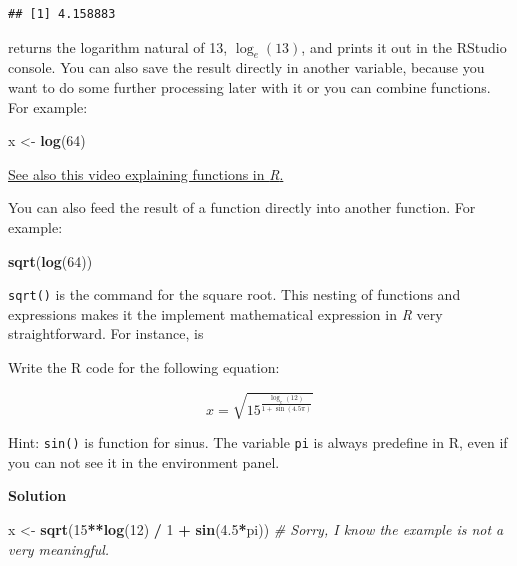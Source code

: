 \documentclass[
]{scrartcl}
\makeatletter
\newenvironment{Shaded}{\begin{snugshade}}{\end{snugshade}}
\newcommand{\CommentTok}[1]{\textcolor[rgb]{0.56,0.35,0.01}{\textit{#1}}}
\newcommand{\DecValTok}[1]{\textcolor[rgb]{0.00,0.00,0.81}{#1}}
\newcommand{\FloatTok}[1]{\textcolor[rgb]{0.00,0.00,0.81}{#1}}
\newcommand{\FunctionTok}[1]{\textcolor[rgb]{0.13,0.29,0.53}{\textbf{#1}}}
\newcommand{\NormalTok}[1]{#1}
\newcommand{\OtherTok}[1]{\textcolor[rgb]{0.56,0.35,0.01}{#1}}
\newcommand{\SpecialCharTok}[1]{\textcolor[rgb]{0.81,0.36,0.00}{\textbf{#1}}}
\newenvironment{kframe}{%
\medskip{}
\setlength{\fboxsep}{.8em}
 \def\at@end@of@kframe{}%
 \ifinner\ifhmode%
  \def\at@end@of@kframe{\end{minipage}}%
  \begin{minipage}{\columnwidth}%
 \fi\fi%
 \def\FrameCommand##1{\hskip\@totalleftmargin \hskip-\fboxsep
 \colorbox{shadecolor}{##1}\hskip-\fboxsep
     \hskip-\linewidth \hskip-\@totalleftmargin \hskip\columnwidth}%
 \MakeFramed {\advance\hsize-\width
   \@totalleftmargin\z@ \linewidth\hsize
   \@setminipage}}%
 {\par\unskip\endMakeFramed%
 \at@end@of@kframe}
\newenvironment{rmdblock}[1]
  {
  \begin{itemize}
  \renewcommand{\labelitemi}{
    \raisebox{-.7\height}[0pt][0pt]{
      {\setkeys{Gin}{width=3em,keepaspectratio}\texttt{[image: images/\#1]}}
    }
  }
  \setlength{\fboxsep}{1em}
  \begin{kframe}
  \item
  }
  {
  \end{kframe}
  \end{itemize}
  }
\newenvironment{simple}
        {}
        {}
\newenvironment{myexercise}
    {\begin{rmdblock}{exercise_green}}
    {\end{rmdblock}}
\newenvironment{webexsolution}[1]
    {\par\tiny\textbf{#1}}
    {\par}
\newcommand{\webexhide}[1]{\begin{webexsolution}{#1}}
\makeatother
\begin{document}
\begin{verbatim}
## [1] 4.158883
\end{verbatim}

returns the logarithm natural of 13, \(\log_e(13)\), and prints it out in the RStudio console. You can also save the result directly in another variable, because you want to do some further processing later with it or you can combine functions. For example:

\begin{Shaded}
\begin{Highlighting}[]
\NormalTok{x }\OtherTok{\textless{}{-}} \FunctionTok{log}\NormalTok{(}\DecValTok{64}\NormalTok{)}
\end{Highlighting}
\end{Shaded}

\begin{simple}
\href{https://vimeo.com/220490105}{See also this video explaining
functions in \emph{R}.}
\end{simple}

You can also feed the result of a function directly into another function. For example:

\begin{Shaded}
\begin{Highlighting}[]
\FunctionTok{sqrt}\NormalTok{(}\FunctionTok{log}\NormalTok{(}\DecValTok{64}\NormalTok{))}
\end{Highlighting}
\end{Shaded}

\texttt{sqrt()} is the command for the square root. This nesting of functions and expressions makes it the implement mathematical expression in \emph{R} very straightforward. For instance, is

\begin{myexercise}
Write the R code for the following equation:

\[x = \sqrt{15^\frac{\log_e(12)}{1+ \sin(4.5 \pi)}}\]

Hint: \texttt{sin()} is function for sinus. The variable \texttt{pi} is
always predefine in R, even if you can not see it in the environment
panel.
\end{myexercise}
\webexhide{Solution}

\begin{Shaded}
\begin{Highlighting}[]
\NormalTok{x }\OtherTok{\textless{}{-}} \FunctionTok{sqrt}\NormalTok{(}\DecValTok{15}\SpecialCharTok{**}\FunctionTok{log}\NormalTok{(}\DecValTok{12}\NormalTok{) }\SpecialCharTok{/} \DecValTok{1} \SpecialCharTok{+} \FunctionTok{sin}\NormalTok{(}\FloatTok{4.5}\SpecialCharTok{*}\NormalTok{pi))}
\CommentTok{\# Sorry, I know the example is not a very meaningful.}
\end{Highlighting}
\end{Shaded}
\end{document}
